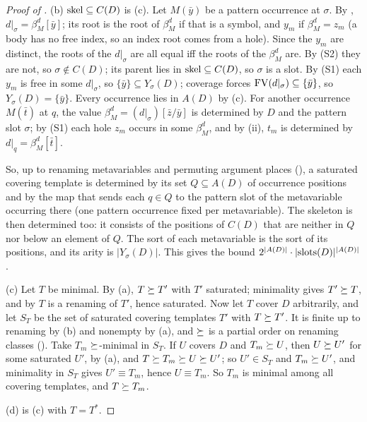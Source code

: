 \begin{proof}[Proof of ]
(b) $\mathrm{skel}\subseteq C(D)$ is (c). Let $M(\bar y)$ be a pattern occurrence at $\sigma$. By , $d|_\sigma=\beta^d_M[\bar y]$; its root is the root of $\beta^d_M$ if that is a symbol, and $y_m$ if $\beta^d_M=z_m$ (a body has no free index, so an index root comes from a hole). Since the $y_m$ are distinct, the roots of the $d|_\sigma$ are all equal iff the roots of the $\beta^d_M$ are. By (S2) they are not, so $\sigma\notin C(D)$; its parent lies in $\mathrm{skel}\subseteq C(D)$, so $\sigma$ is a slot. By (S1) each $y_m$ is free in some $d|_\sigma$, so $\{\bar y\}\subseteq Y_\sigma(D)$; coverage forces $\mathrm{FV}(d|_\sigma)\subseteq\{\bar y\}$, so $Y_\sigma(D)=\{\bar y\}$. Every occurrence lies in $A(D)$ by (c). For another occurrence $M(\bar t)$ at $q$, the value $\beta^d_M=(d|_\sigma)[\bar z/\bar y]$ is determined by $D$ and the pattern slot $\sigma$; by (S1) each hole $z_m$ occurs in some $\beta^d_M$, and by (ii), $t_m$ is determined by $d|_q=\beta^d_M[\bar t]$.

So, up to renaming metavariables and permuting argument places (), a saturated covering template is determined by its set $Q\subseteq A(D)$ of occurrence positions and by the map that sends each $q\in Q$ to the pattern slot of the metavariable occurring there (one pattern occurrence fixed per metavariable). The skeleton is then determined too: it consists of the positions of $C(D)$ that are neither in $Q$ nor below an element of $Q$. The sort of each metavariable is the sort of its positions, and its arity is $|Y_\sigma(D)|$. This gives the bound $2^{|A(D)|}\cdot|\mathrm{slots}(D)|^{|A(D)|}$.

(c) Let $T$ be minimal. By (a), $T\succeq T'$ with $T'$ saturated; minimality gives $T'\succeq T$, and by  $T$ is a renaming of $T'$, hence saturated. Now let $T$ cover $D$ arbitrarily, and let $S_T$ be the set of saturated covering templates $T'$ with $T\succeq T'$. It is finite up to renaming by (b) and nonempty by (a), and $\succeq$ is a partial order on renaming classes (). Take $T_m$ $\succeq$-minimal in $S_T$. If $U$ covers $D$ and $T_m\succeq U$, then $U\succeq U'$ for some saturated $U'$, by (a), and $T\succeq T_m\succeq U\succeq U'$; so $U'\in S_T$ and $T_m\succeq U'$, and minimality in $S_T$ gives $U'\equiv T_m$, hence $U\equiv T_m$. So $T_m$ is minimal among all covering templates, and $T\succeq T_m$.

(d) is (c) with $T=T^*$.
\end{proof}

